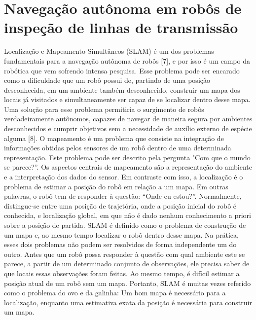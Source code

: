 \section{Navegação autônoma em robôs de inspeção de linhas de transmissão}
Localização e Mapeamento Simultâneos (SLAM) é um dos problemas fundamentais para a navegação autônoma de robôs [7], e por isso é um campo da robótica que vem sofrendo intensa pesquisa. Esse problema pode ser encarado como a dificuldade que um robô possui de, partindo de uma posição desconhecida, em um ambiente também desconhecido, construir um mapa dos locais já visitados e simultaneamente ser capaz de se localizar dentro desse mapa. Uma solução para esse problema permitiria o surgimento de robôs verdadeiramente autônomos, capazes de navegar de maneira segura por ambientes desconhecidos e cumprir objetivos sem a necessidade de auxílio externo de espécie alguma [8].
O mapeamento é um problema que consiste na integração de informações obtidas pelos sensores de um robô dentro de uma determinada representação. Este problema pode ser descrito pela pergunta "Com que o mundo se parece?”. Os aspectos centrais de mapeamento são a representação do ambiente e a interpretação dos dados do sensor. Em contraste com isso, a localização é o problema de estimar a posição do robô em relação a um mapa. Em outras palavras, o robô tem de responder à questão: “Onde eu estou?”. Normalmente, distingue-se entre uma posição de trajetória, onde a posição inicial do robô é conhecida, e localização global, em que não é dado nenhum conhecimento a priori sobre a posição de partida.
SLAM é definido como o problema de construção de um mapa e, ao mesmo tempo localizar o robô dentro desse mapa. Na prática, esses dois problemas não podem ser resolvidos de forma independente um do outro. Antes que um robô possa responder à questão com qual ambiente este se parece, a partir de um determinado conjunto de observações, ele precisa saber de que locais essas observações foram feitas. Ao mesmo tempo, é difícil estimar a posição atual de um robô sem um mapa. Portanto, SLAM é muitas vezes referido como o problema do ovo e da galinha: Um bom mapa é necessário para a localização, enquanto uma estimativa exata da posição é necessária para construir um mapa.


